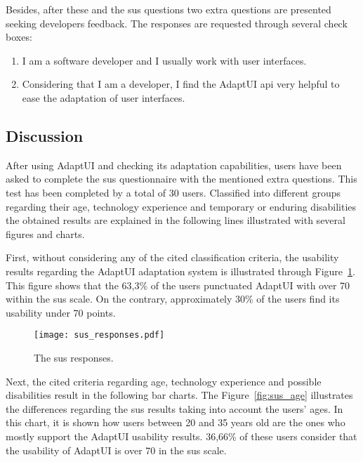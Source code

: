 Besides, after these and the \ac{sus} questions two extra questions are presented
seeking developers feedback. The responses are requested through several check 
boxes:

\begin{enumerate}[label=\alph*)]
  \item I am a software developer and I usually work with user interfaces.
  \item Considering that I am a developer, I find the AdaptUI \ac{api} very
  helpful to ease the adaptation of user interfaces.
\end{enumerate}


\subsection{Discussion}
\label{sec:user_evaluation_discussion}

After using AdaptUI and checking its adaptation capabilities, users have been 
asked to complete the \ac{sus} questionnaire with the mentioned extra questions. 
This test has been completed by a total of 30 users. Classified into different 
groups regarding their age, technology experience and temporary or enduring 
disabilities the obtained results are explained in the following lines illustrated 
with several figures and charts.

First, without considering any of the cited classification criteria, the usability 
results regarding the AdaptUI adaptation system is illustrated through 
Figure~\ref{fig:sus_responses}. This figure shows that the 63,3\% of the users
punctuated AdaptUI with over 70 within the \ac{sus} scale. On the contrary, 
approximately 30\% of the users find its usability under 70 points.

\begin{figure}
\centering
\texttt{[image: sus\_responses.pdf]}
\caption{The \ac{sus} responses.}
\label{fig:sus_responses}
\end{figure}

Next, the cited criteria regarding age, technology experience and possible
disabilities result in the following bar charts. The Figure~\ref{fig:sus_age}
illustrates the differences regarding the \ac{sus} results taking into account the
users' ages. In this chart, it is shown how users between 20 and 35 years old
are the ones who mostly support the AdaptUI usability results. 36,66\% of
these users consider that the usability of AdaptUI is over 70 in the \ac{sus} scale.

